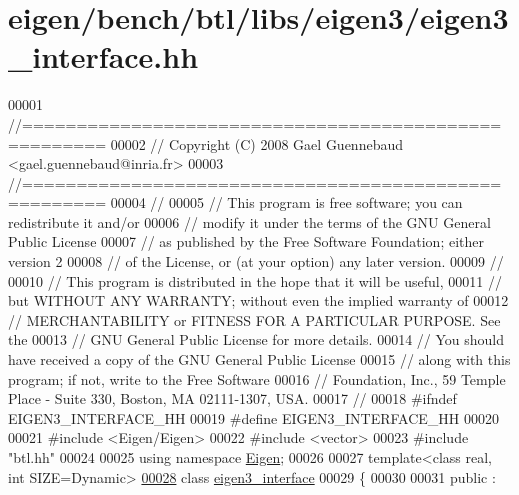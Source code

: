 \hypertarget{eigen_2bench_2btl_2libs_2eigen3_2eigen3__interface_8hh_source}{}\section{eigen/bench/btl/libs/eigen3/eigen3\+\_\+interface.hh}
\label{eigen_2bench_2btl_2libs_2eigen3_2eigen3__interface_8hh_source}

\begin{DoxyCode}
00001 \textcolor{comment}{//=====================================================}
00002 \textcolor{comment}{// Copyright (C) 2008 Gael Guennebaud <gael.guennebaud@inria.fr>}
00003 \textcolor{comment}{//=====================================================}
00004 \textcolor{comment}{//}
00005 \textcolor{comment}{// This program is free software; you can redistribute it and/or}
00006 \textcolor{comment}{// modify it under the terms of the GNU General Public License}
00007 \textcolor{comment}{// as published by the Free Software Foundation; either version 2}
00008 \textcolor{comment}{// of the License, or (at your option) any later version.}
00009 \textcolor{comment}{//}
00010 \textcolor{comment}{// This program is distributed in the hope that it will be useful,}
00011 \textcolor{comment}{// but WITHOUT ANY WARRANTY; without even the implied warranty of}
00012 \textcolor{comment}{// MERCHANTABILITY or FITNESS FOR A PARTICULAR PURPOSE.  See the}
00013 \textcolor{comment}{// GNU General Public License for more details.}
00014 \textcolor{comment}{// You should have received a copy of the GNU General Public License}
00015 \textcolor{comment}{// along with this program; if not, write to the Free Software}
00016 \textcolor{comment}{// Foundation, Inc., 59 Temple Place - Suite 330, Boston, MA  02111-1307, USA.}
00017 \textcolor{comment}{//}
00018 \textcolor{preprocessor}{#ifndef EIGEN3\_INTERFACE\_HH}
00019 \textcolor{preprocessor}{#define EIGEN3\_INTERFACE\_HH}
00020 
00021 \textcolor{preprocessor}{#include <Eigen/Eigen>}
00022 \textcolor{preprocessor}{#include <vector>}
00023 \textcolor{preprocessor}{#include "btl.hh"}
00024 
00025 \textcolor{keyword}{using namespace }\hyperlink{namespace_eigen}{Eigen};
00026 
00027 \textcolor{keyword}{template}<\textcolor{keyword}{class} real, \textcolor{keywordtype}{int} SIZE=Dynamic>
\hyperlink{classeigen3__interface}{00028} \textcolor{keyword}{class }\hyperlink{classeigen3__interface}{eigen3\_interface}
00029 \{
00030 
00031 public :

\end{DoxyCode}
